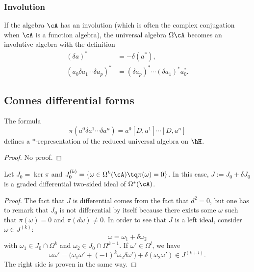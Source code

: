 \subsubsection{Involution}

If the algebra $\cA$ has an involution (which is often the complex conjugation when $\cA$ is a function algebra), the universal algebra $\Omega\cA$ becomes an involutive algebra with the definition
\begin{align*}
	(\delta a)^*                      & =-\delta(a^*),                            \\
	(a_0\delta a_1\cdots\delta a_p)^* & =(\delta a_p)^*\cdots(\delta a_1)^*a_0^*.
\end{align*}


\subsection{Connes differential forms}

\begin{proposition}
	The formula
	\[
		\pi(a^0\delta a^1\cdots \delta a^{n})=a^0[D,a^1]\cdots[D,a^{n}]
	\]
	defines a $*$-representation of the reduced universal algebra on $\hH$.
\end{proposition}
\begin{proof}
	No proof.
\end{proof}

\begin{proposition}
	Let $J_0=\ker\pi$ and $J_0^{(k)}=\{ \omega\in\Omega^k(\cA)\tq \pi(\omega)=0 \}$. In this case, $J:=J_0+\delta J_0$ is a graded differential two-sided ideal of $\Omega^*(\cA)$.
\end{proposition}

\begin{proof}
	The fact that $J$ is differential comes from the fact that $d^2=0$, but one has to remark that $J_0$ is not differential by itself because there exists some  $\omega$ such that $\pi(\omega)=0$ and $\pi(d\omega)\neq 0$. In order to see that $J$ is a left ideal, consider $\omega\in J^{(k)}$:
	\[
		\omega=\omega_1+\delta\omega_2
	\]
	with $\omega_1\in J_0\cap\Omega^k$ and $\omega_2\in J_0\cap\Omega^{k-1}$. If $\omega'\in\Omega^l$, we have
	\[
		\omega\omega'=\big( \omega_1\omega'+(-1)^k\omega_2\delta\omega' \big)+\delta(\omega_2\omega')\in J^{(k+l)}.
	\]
	The right side is proven in the same way.
\end{proof}


